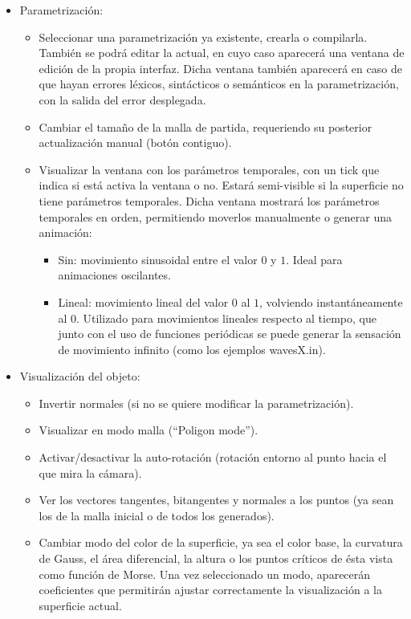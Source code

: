 \begin{itemize}
	\item Parametrización:
	\begin{itemize}
		\item Seleccionar una parametrización ya existente, crearla o compilarla. También se podrá editar la actual, en cuyo caso aparecerá una ventana de edición de la propia interfaz. Dicha ventana también aparecerá en caso de que hayan errores léxicos, sintácticos o semánticos en la parametrización, con la salida del error desplegada.
		\item Cambiar el tamaño de la malla de partida, requeriendo su posterior actualización manual (botón contiguo).
		\item Visualizar la ventana con los parámetros temporales, con un tick que indica si está activa la ventana o no. Estará semi-visible si la superficie no tiene parámetros temporales. Dicha ventana mostrará los parámetros temporales en orden, permitiendo moverlos manualmente o generar una animación:
		\begin{itemize}
			\item Sin: movimiento sinusoidal entre el valor $0$ y $1$. Ideal para animaciones oscilantes.
			\item Lineal: movimiento lineal del valor $0$ al $1$, volviendo instantáneamente al $0$. Utilizado para movimientos lineales respecto al tiempo, que junto con el uso de funciones periódicas se puede generar la sensación de movimiento infinito (como los ejemplos wavesX.in).
		\end{itemize}
	\end{itemize}
	\item Visualización del objeto:
	\begin{itemize}
		\item Invertir normales (si no se quiere modificar la parametrización).
		\item Visualizar en modo malla (``Poligon mode'').
		\item Activar/desactivar la auto-rotación (rotación entorno al punto hacia el que mira la cámara).
		\item Ver los vectores tangentes, bitangentes y normales a los puntos (ya sean los de la malla inicial o de todos los generados).
		\item Cambiar modo del color de la superficie, ya sea el color base, la curvatura de Gauss, el área diferencial, la altura o los puntos críticos de ésta vista como función de Morse. Una vez seleccionado un modo, aparecerán coeficientes que permitirán ajustar correctamente la visualización a la superficie actual.

\end{itemize}
\end{itemize}

